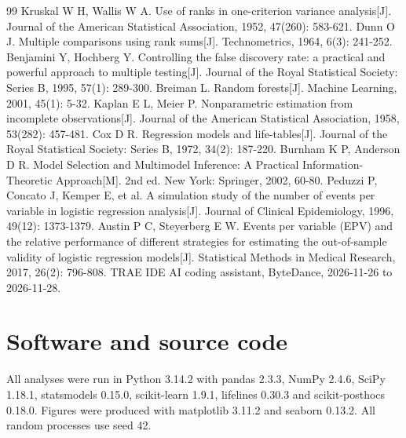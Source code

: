 \documentclass{apmcmthesis}
\begin{document}
\makeatletter
\renewcommand{\@openbib@code}{\setlength{\itemsep}{0pt}}
\makeatother
\begin{thebibliography}{99}
 Kruskal W H, Wallis W A. Use of ranks in one-criterion variance
analysis[J]. Journal of the American Statistical Association, 1952, 47(260): 583-621.
 Dunn O J. Multiple comparisons using rank sums[J]. Technometrics, 1964,
6(3): 241-252.
 Benjamini Y, Hochberg Y. Controlling the false discovery rate: a practical
and powerful approach to multiple testing[J]. Journal of the Royal Statistical Society:
Series B, 1995, 57(1): 289-300.
 Breiman L. Random forests[J]. Machine Learning, 2001, 45(1): 5-32.
 Kaplan E L, Meier P. Nonparametric estimation from incomplete
observations[J]. Journal of the American Statistical Association, 1958, 53(282): 457-481.
 Cox D R. Regression models and life-tables[J]. Journal of the Royal
Statistical Society: Series B, 1972, 34(2): 187-220.
 Burnham K P, Anderson D R. Model Selection and Multimodel Inference: A
Practical Information-Theoretic Approach[M]. 2nd ed. New York: Springer, 2002, 60-80.
 Peduzzi P, Concato J, Kemper E, et al. A simulation study of the number
of events per variable in logistic regression analysis[J]. Journal of Clinical
Epidemiology, 1996, 49(12): 1373-1379.
 Austin P C, Steyerberg E W. Events per variable (EPV) and the relative
performance of different strategies for estimating the out-of-sample validity of logistic
regression models[J]. Statistical Methods in Medical Research, 2017, 26(2): 796-808.
 TRAE IDE AI coding assistant, ByteDance, 2026-11-26 to 2026-11-28.
\end{thebibliography}

\newpage
\appendix
\section{Software and source code}

All analyses were run in Python 3.14.2 with pandas 2.3.3, NumPy 2.4.6, SciPy 1.18.1,
statsmodels 0.15.0, scikit-learn 1.9.1, lifelines 0.30.3 and scikit-posthocs 0.18.0.
Figures were produced with matplotlib 3.11.2 and seaborn 0.13.2. All random processes
use seed 42.
\end{document}

